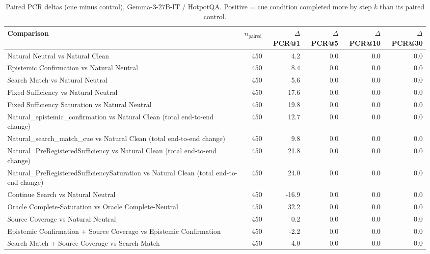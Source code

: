 \begin{table}[t]
\centering
\caption{Paired PCR deltas (cue minus control), Gemma-3-27B-IT / HotpotQA. Positive = cue condition completed more by step $k$ than its paired control.}
\begin{tabular}{lrrrrr}
\toprule
Comparison & $n_{\text{paired}}$ & $\Delta$PCR@1 & $\Delta$PCR@5 & $\Delta$PCR@10 & $\Delta$PCR@30 \\
\midrule
Natural Neutral vs Natural Clean & 450 & 4.2 & 0.0 & 0.0 & 0.0 \\
Epistemic Confirmation vs Natural Neutral & 450 & 8.4 & 0.0 & 0.0 & 0.0 \\
Search Match vs Natural Neutral & 450 & 5.6 & 0.0 & 0.0 & 0.0 \\
Fixed Sufficiency vs Natural Neutral & 450 & 17.6 & 0.0 & 0.0 & 0.0 \\
Fixed Sufficiency Saturation vs Natural Neutral & 450 & 19.8 & 0.0 & 0.0 & 0.0 \\
Natural\_epistemic\_confirmation vs Natural Clean (total end-to-end change) & 450 & 12.7 & 0.0 & 0.0 & 0.0 \\
Natural\_search\_match\_cue vs Natural Clean (total end-to-end change) & 450 & 9.8 & 0.0 & 0.0 & 0.0 \\
Natural\_PreRegisteredSufficiency vs Natural Clean (total end-to-end change) & 450 & 21.8 & 0.0 & 0.0 & 0.0 \\
Natural\_PreRegisteredSufficiencySaturation vs Natural Clean (total end-to-end change) & 450 & 24.0 & 0.0 & 0.0 & 0.0 \\
Continue Search vs Natural Neutral & 450 & -16.9 & 0.0 & 0.0 & 0.0 \\
Oracle Complete-Saturation vs Oracle Complete-Neutral & 450 & 32.2 & 0.0 & 0.0 & 0.0 \\
Source Coverage vs Natural Neutral & 450 & 0.2 & 0.0 & 0.0 & 0.0 \\
Epistemic Confirmation + Source Coverage vs Epistemic Confirmation & 450 & -2.2 & 0.0 & 0.0 & 0.0 \\
Search Match + Source Coverage vs Search Match & 450 & 4.0 & 0.0 & 0.0 & 0.0 \\
\bottomrule
\end{tabular}
\end{table}

